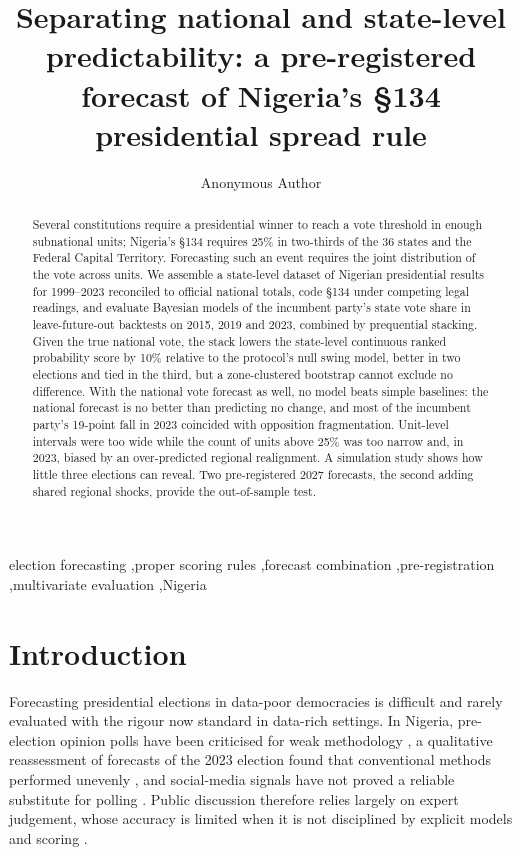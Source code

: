\documentclass[preprint,12pt,authoryear]{elsarticle}
\begin{document}
\begin{frontmatter}

\title{Separating national and state-level predictability: a pre-registered forecast of Nigeria's \S134 presidential spread rule}

\author[inst1]{Anonymous Author}

\begin{abstract}
Several constitutions require a presidential winner to reach a vote threshold in enough subnational units; Nigeria's \S134 requires 25\% in two-thirds of the 36 states and the Federal Capital Territory. Forecasting such an event requires the joint distribution of the vote across units. We assemble a state-level dataset of Nigerian presidential results for 1999--2023 reconciled to official national totals, code \S134 under competing legal readings, and evaluate Bayesian models of the incumbent party's state vote share in leave-future-out backtests on 2015, 2019 and 2023, combined by prequential stacking. Given the true national vote, the stack lowers the state-level continuous ranked probability score by 10\% relative to the protocol's null swing model, better in two elections and tied in the third, but a zone-clustered bootstrap cannot exclude no difference. With the national vote forecast as well, no model beats simple baselines: the national forecast is no better than predicting no change, and most of the incumbent party's 19-point fall in 2023 coincided with opposition fragmentation. Unit-level intervals were too wide while the count of units above 25\% was too narrow and, in 2023, biased by an over-predicted regional realignment. A simulation study shows how little three elections can reveal. Two pre-registered 2027 forecasts, the second adding shared regional shocks, provide the out-of-sample test.
\end{abstract}

\begin{keyword}
election forecasting \sep proper scoring rules \sep forecast combination \sep pre-registration \sep multivariate evaluation \sep Nigeria
\end{keyword}

\end{frontmatter}

\section{Introduction}
\label{sec:intro}
Forecasting presidential elections in data-poor democracies is difficult and rarely evaluated with the rigour now standard in data-rich settings. In Nigeria, pre-election opinion polls have been criticised for weak methodology \citep{Mohammed2024OpinionPolls}, a qualitative reassessment of forecasts of the 2023 election found that conventional methods performed unevenly \citep{Murana2026RevisitingConventional}, and social-media signals have not proved a reliable substitute for polling \citep{Brito2021SystematicReview}. Public discussion therefore relies largely on expert judgement, whose accuracy is limited when it is not disciplined by explicit models and scoring \citep{Tetlock2006ExpertPolitical}.
\end{document}
